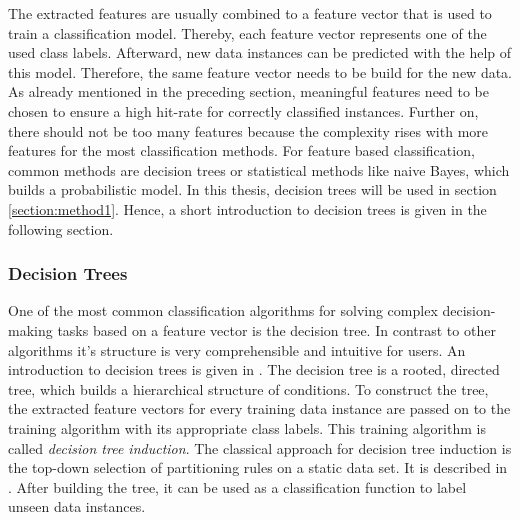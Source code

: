 The extracted features are usually combined to a feature vector that is used to train a classification model. Thereby, each feature vector represents one of the used class labels. Afterward, new data instances can be predicted with the help of this model. Therefore, the same feature vector needs to be build for the new data. As already mentioned in the preceding section, meaningful features need to be chosen to ensure a high hit-rate for correctly classified instances. Further on, there should not be too many features because the complexity rises with more features for the most classification methods. For feature based classification, common methods are decision trees or statistical methods like naive Bayes, which builds a probabilistic model. In this thesis, decision trees will be used in section \ref{section:method1}. Hence, a short introduction to decision trees is given in the following section.


\subsubsection{Decision Trees} 

One of the most common classification algorithms for solving complex decision-making tasks based on a feature vector is the decision tree. In contrast to other algorithms it's structure is very comprehensible and intuitive for users. An introduction to decision trees is given in \autocite{Chapman:2015}. The decision tree is a rooted, directed tree, which builds a hierarchical structure of conditions. To construct the tree, the extracted feature vectors for every training data instance are passed on to the training algorithm with its appropriate class labels. This training algorithm is called \textit{decision tree induction}. The classical approach for decision tree induction is the top-down selection of partitioning rules on a static data set. It is described in \autocite{Chapman:2015}. After building the tree, it can be used as a classification function to label unseen data instances. 

